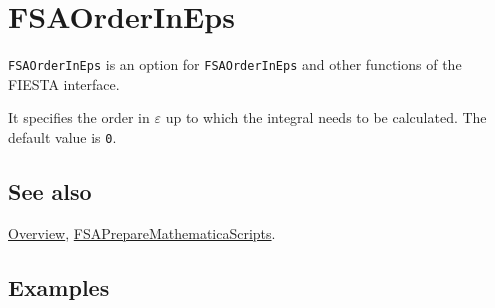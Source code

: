 \documentclass[../FeynHelpersManual.tex]{subfiles}
\begin{document}
\begin{Shaded}
\begin{Highlighting}[]
 
\end{Highlighting}
\end{Shaded}

\hypertarget{fsaorderineps}{
\section{FSAOrderInEps}\label{fsaorderineps}}

\texttt{FSAOrderInEps} is an option for \texttt{FSAOrderInEps} and other
functions of the FIESTA interface.

It specifies the order in \(\varepsilon\) up to which the integral needs
to be calculated. The default value is \texttt{0}.

\subsection{See also}

\hyperlink{toc}{Overview},
\hyperlink{fsapreparemathematicascripts}{FSAPrepareMathematicaScripts}.

\subsection{Examples}
\end{document}
